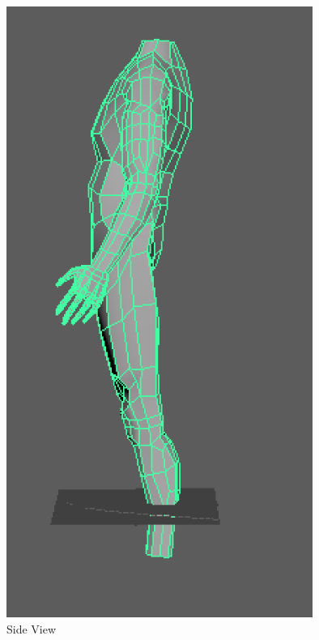 \documentclass[a4paper]{article}
\begin{document}
\begin{figure}[h]
\centering
\includegraphics[width=10cm]{img/Side.png}
\caption{Side View}
\label{fig:Side View}
\end{figure}
\end{document}
